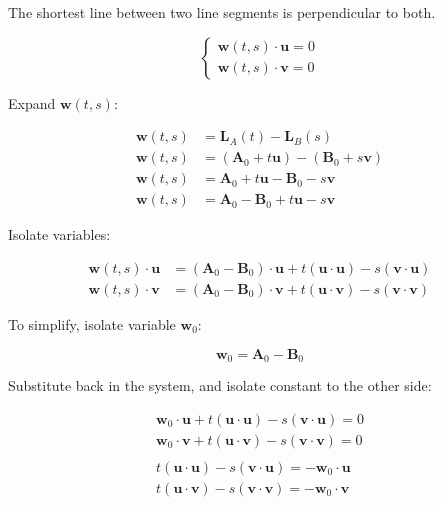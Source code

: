 \documentclass{article}
\begin{document}
The shortest line between two line segments is perpendicular to both.

\[
\begin{cases}
    \mathbf{w}(t, s) \cdot \mathbf{u} = 0 \\
    \mathbf{w}(t, s) \cdot \mathbf{v} = 0
\end{cases}
\]

Expand $\mathbf{w}(t, s)$:

\begin{align*}
    \mathbf{w}(t, s) &= \mathbf{L}_A(t) - \mathbf{L}_B(s) \\
    \mathbf{w}(t, s) &= (\mathbf{A}_0 + t\mathbf{u}) - (\mathbf{B}_0 + s\mathbf{v}) \\
    \mathbf{w}(t, s) &= \mathbf{A}_0 + t\mathbf{u} - \mathbf{B}_0 - s\mathbf{v} \\
    \mathbf{w}(t, s) &= \mathbf{A}_0 - \mathbf{B}_0 + t\mathbf{u} - s\mathbf{v}
\end{align*}

Isolate variables:

\begin{align*}
    \mathbf{w}(t, s) \cdot \mathbf{u} &= (\mathbf{A}_0 - \mathbf{B}_0) \cdot \mathbf{u} + t(\mathbf{u} \cdot \mathbf{u}) - s(\mathbf{v} \cdot \mathbf{u}) \\
    \mathbf{w}(t, s) \cdot \mathbf{v} &= (\mathbf{A}_0 - \mathbf{B}_0) \cdot \mathbf{v} + t(\mathbf{u} \cdot \mathbf{v}) - s(\mathbf{v} \cdot \mathbf{v})
\end{align*}

To simplify, isolate variable $\mathbf{w}_0$:

\[
\mathbf{w}_0 = \mathbf{A}_0 - \mathbf{B}_0
\]

Substitute back in the system, and isolate constant to the other side:

\begin{align*}
    \mathbf{w}_0 \cdot \mathbf{u} + t(\mathbf{u} \cdot \mathbf{u}) - s(\mathbf{v} \cdot \mathbf{u}) = 0 \\
    \mathbf{w}_0 \cdot \mathbf{v} + t(\mathbf{u} \cdot \mathbf{v}) - s(\mathbf{v} \cdot \mathbf{v}) = 0 \\
    \\
    t(\mathbf{u} \cdot \mathbf{u}) - s(\mathbf{v} \cdot \mathbf{u}) = - \mathbf{w}_0 \cdot \mathbf{u} \\
    t(\mathbf{u} \cdot \mathbf{v}) - s(\mathbf{v} \cdot \mathbf{v}) = - \mathbf{w}_0 \cdot \mathbf{v} \\
\end{align*}
\end{document}
